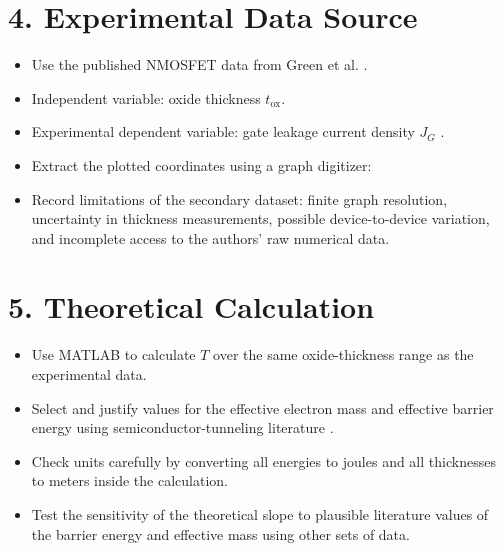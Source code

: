\documentclass[12pt]{article}
\begin{document}
\section*{4. Experimental Data Source}
\begin{itemize}
    \item Use the published NMOSFET data from Green et al. \cite{green1999limits}.
    \item Independent variable: oxide thickness \(t_{\mathrm{ox}}\).
    \item Experimental dependent variable: gate leakage current density \(J_G\) .
    \item Extract the plotted coordinates using a graph digitizer:
    \item Record limitations of the secondary dataset: finite graph resolution, uncertainty in thickness measurements, possible device-to-device variation, and incomplete access to the authors' raw numerical data.
\end{itemize}

\section*{5. Theoretical Calculation}
\begin{itemize}
    \item Use MATLAB to calculate \(T\) over the same oxide-thickness range as the experimental data.
    \item Select and justify values for the effective electron mass and effective barrier energy using semiconductor-tunneling literature \cite{depas1995,green2001review}.
    \item Check units carefully by converting all energies to joules and all thicknesses to meters inside the calculation.
    \item Test the sensitivity of the theoretical slope to plausible literature values of the barrier energy and effective mass using other sets of data.
\end{itemize}
\end{document}
